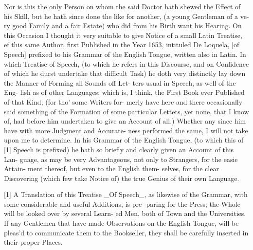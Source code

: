 Nor is this the only Person on whom
the said Doctor hath shewed the Effect of
his Skill, but he hath since done the like
for another, (a young Gentleman of a ve-
ry good Family and a fair Estate) who
did from his Birth want his Hearing. On
this Occasion I thought it very suitable to
give Notice of a small Latin Treatise, ef
this same Author, first Published in the
Year 1653, intituled De Loquela, [of
Speech] prefixed to his Grammar of the
English Tongue, written also in Latin. In
which Treatise of Speech, (to which he
refers in this Discourse, and on Confidence
of which he durst undertake that difficult
Task) he doth very distinctly lay down
the Manner of Forming all Sounds off Let-
ters usual in Speech, as well of the Eng-
lish as of other Languages; which is, I
think, the First Book ever Published of
that Kind; (for tho' some Writers for-
merly have here and there occasionally
said something of the Formation of some
particular Lettets, yet none, that I know
of, had before him undertaken to give an
Account of all.) Whether any since him
have with more Judgment and Accurate-
ness performed the same, I will not take
upon me to determine. In his Grammar
of the English Tongue, (to which this of
[1] Speech is prefixed) he hath so briefly
and clearly given an Account of this Lan-
guage, as may be very Advantageous, not
only to Strangers, for the easie Attain-
ment thereof, but even to the English them-
selves, for the clear Discovering (which
few take Notice of) the true Genius of
their own Language.

[1] A Translation of this Treatise _Of Speech_, as
likewise of the Grammar, with some considerable and
useful Additions, is pre-
paring for the Press; the Whole will be looked over by several Learn-
ed Men, both of Town and the Universities. If any Gentlemen that
have made Observations on the English Tongue, will be pleas'd to
communicate them to the Bookseller, they shall be carefully inserted
in their proper Places.
